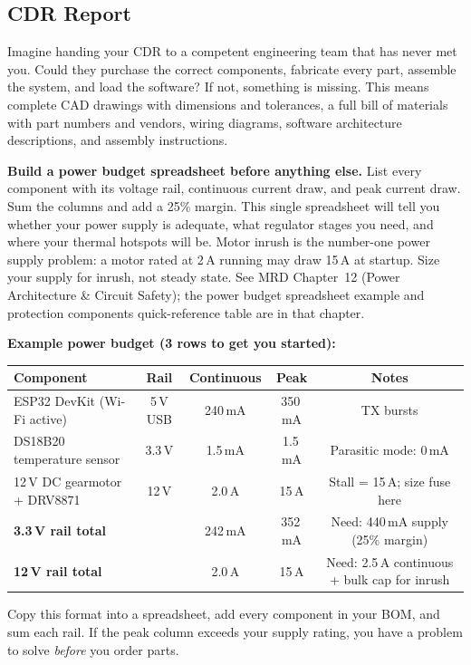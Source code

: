 \subsection{CDR Report}

\begin{faqbox}
Imagine handing your CDR to a competent engineering team that has never met you. Could they purchase the correct components, fabricate every part, assemble the system, and load the software? If not, something is missing. This means complete CAD drawings with dimensions and tolerances, a full bill of materials with part numbers and vendors, wiring diagrams, software architecture descriptions, and assembly instructions.
\end{faqbox}

\begin{protip}
\textbf{Build a power budget spreadsheet before anything else.} List every component with its voltage rail, continuous current draw, and peak current draw. Sum the columns and add a 25\% margin. This single spreadsheet will tell you whether your power supply is adequate, what regulator stages you need, and where your thermal hotspots will be. Motor inrush is the number-one power supply problem: a motor rated at 2\,A running may draw 15\,A at startup. Size your supply for inrush, not steady state. See MRD Chapter~12 (Power Architecture \& Circuit Safety); the power budget spreadsheet example and protection components quick-reference table are in that chapter.

\vspace{4pt}
\textbf{Example power budget (3 rows to get you started):}

\begin{center}\small
\begin{tabularx}{0.95\textwidth}{l c c c c}
\toprule
\textbf{Component} & \textbf{Rail} & \textbf{Continuous} & \textbf{Peak} & \textbf{Notes} \\
\midrule
ESP32 DevKit (Wi-Fi active) & 5\,V USB & 240\,mA & 350\,mA & TX bursts \\
DS18B20 temperature sensor & 3.3\,V & 1.5\,mA & 1.5\,mA & Parasitic mode: 0\,mA \\
12\,V DC gearmotor + DRV8871 & 12\,V & 2.0\,A & 15\,A & Stall = 15\,A; size fuse here \\
\midrule
\textbf{3.3\,V rail total} & & 242\,mA & 352\,mA & Need: 440\,mA supply (25\% margin) \\
\textbf{12\,V rail total} & & 2.0\,A & 15\,A & Need: 2.5\,A continuous + bulk cap for inrush \\
\bottomrule
\end{tabularx}
\end{center}
\vspace{2pt}
\noindent Copy this format into a spreadsheet, add every component in your BOM, and sum each rail. If the peak column exceeds your supply rating, you have a problem to solve \textit{before} you order parts.
\end{protip}

